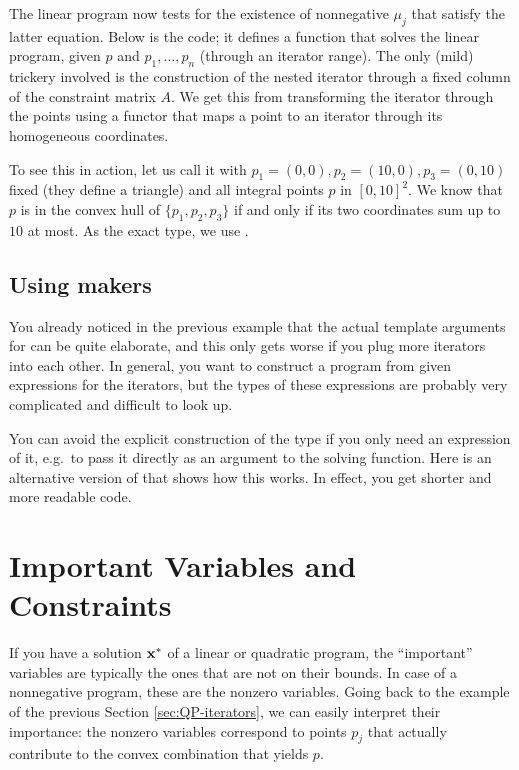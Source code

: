 The linear program now tests for the existence of nonnegative $\mu_j$
that satisfy the latter equation. Below is the code; it defines a
function that solves the linear program, given $p$ and
$p_1,\ldots,p_n$ (through an iterator range). The only (mild)
trickery involved is the construction of the nested iterator 
through a fixed column of the constraint matrix $A$. We get this
from transforming the iterator through the points using a functor 
that maps a point to an iterator through its homogeneous coordinates.


To see this in action, let us call it with $p_1=(0,0), p_2=(10,0),
p_3=(0,10)$ fixed (they define a triangle) and all integral points $p$
in $[0,10]^2$. We know that $p$ is in the convex hull of
$\{p_1,p_2,p_3\}$ if and only if its two coordinates sum up to $10$ at
most. As the exact type, we use .


\subsection{Using makers}\label{sec:QP-makers}
You already noticed in the previous example that the actual 
template arguments for 
can be quite elaborate, and this only gets worse if you plug more 
iterators into each other. In general, you want to construct a 
program from given expressions for the iterators, but the
types of these expressions are probably very complicated and 
difficult to look up. 

You can avoid the explicit construction of the type
if you only need an expression of it, e.g.\ to pass it directly 
as an argument to the solving function. Here is an alternative
version of 
that shows how this works. In effect, you get shorter and more
readable code.



\section{Important Variables and Constraints}
If you have a solution $\mathbf{x}^*$ of a linear or quadratic program,
the ``important'' variables are typically the ones that are not on
their bounds. In case of a nonnegative program, these are the nonzero
variables.  Going back to the example of the previous Section
\ref{sec:QP-iterators}, we can easily interpret their
importance: the nonzero variables correspond to points $p_j$ that
actually contribute to the convex combination that yields $p$. 


